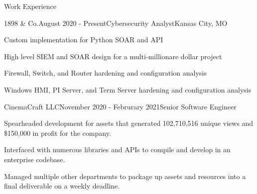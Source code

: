 \documentclass{resume}
\begin{document}
\begin{rSection}{Work Experience}
\begin{rSubsection}{1898 \& Co.}{August 2020 - Present}{Cybersecurity Analyst}{Kansas City, MO} 
    \item Custom implementation for Python SOAR and API 
    \item High level SIEM and SOAR design for a multi-millionare dollar project
    \item Firewall, Switch, and Router hardening and configuration analysis
    \item Windows HMI, PI Server, and Term Server hardening and configuration analysis
\end{rSubsection} 
\begin{rSubsection}{CinemaCraft LLC}{November 2020 - Februrary 2021}{Senior Software Engineer}{}
\item Spearheaded development for assets that generated 102,710,516 unique views and \$150,000 in profit for the company.
    \item Interfaced with numerous libraries and APIs to compile and develop in an enterprise codebase.
    \item Managed multiple other departments to package up assets and resources into a final deliverable on a weekly deadline.
\end{rSubsection}


\end{rSection}
\end{document}

